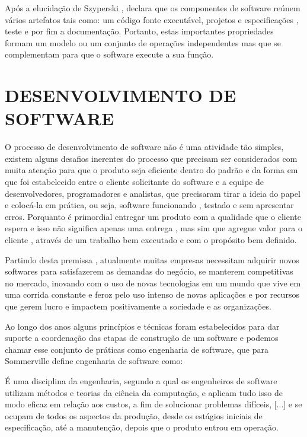\documentclass[
	12pt,				%
	oneside,			%
	a4paper,			%
  section=TITLE,
	brazil,				%
	]{abntex2}
\begin{document}
Após a elucidação de Szyperski ,\cite{Dsouza}  declara que os componentes de
software reúnem vários artefatos tais como: um código fonte executável, projetos e
especificações , teste e por fim a documentação. Portanto, estas importantes
propriedades formam um modelo ou um conjunto de operações independentes mas que se
complementam para que o software execute a sua função.

\section{DESENVOLVIMENTO DE SOFTWARE}

O processo de desenvolvimento de software não é uma atividade tão simples,
existem alguns desafios inerentes do processo que precisam ser considerados com
muita atenção para que o produto seja eficiente dentro do padrão e da forma em
que foi estabelecido entre o cliente solicitante do software e a equipe de
desenvolvedores, programadores e analistas, que precisaram tirar a ideia do
papel e colocá-la em prática, ou seja, software funcionando , testado e sem
apresentar erros. Porquanto é primordial entregar um produto com a qualidade
que o cliente espera e isso não significa apenas uma entrega , mas sim que
agregue valor para o cliente , através de um trabalho bem executado e com o
propósito bem definido.

Partindo desta premissa , atualmente muitas empresas necessitam adquirir novos
softwares para satisfazerem as demandas do negócio, se manterem competitivas no mercado,
inovando com o uso de novas tecnologias em um mundo que vive em uma corrida constante e
feroz pelo uso intenso de novas aplicações e por recursos que gerem lucro e impactem
positivamente a sociedade e as organizações.

Ao longo dos anos alguns princípios e técnicas foram estabelecidos para dar suporte
a coordenação das etapas de construção de um software e podemos chamar esse conjunto de
práticas como engenharia de software, que para  Sommerville define engenharia de software
como:
\begin{citacao}
É uma disciplina da engenharia, segundo a qual os engenheiros de software
utilizam métodos e teorias da ciência da computação, e aplicam tudo isso de
modo eficaz em relação aos custos, a fim de solucionar problemas difíceis, [...]
e se ocupam de todos os aspectos da produção, desde os estágios iniciais de
especificação, até a manutenção, depois que o produto entrou em operação.\cite{sommerville2019engenharia}
\end{citacao}
\end{document}
